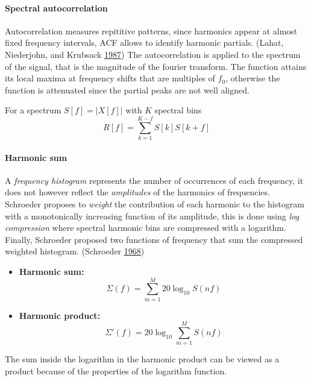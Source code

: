 \documentclass[american,]{article}
\providecommand{\tightlist}{%
  \setlength{\itemsep}{0pt}\setlength{\parskip}{0pt}}
\let\oldparagraph\paragraph
\renewcommand{\paragraph}[1]{\oldparagraph{#1}\mbox{}}
\begin{document}
\hypertarget{spectral-autocorrelation}{%
\paragraph{Spectral autocorrelation}\label{spectral-autocorrelation}}

Autocorrelation measures repititive patterns, since harmonics
appear at almost fixed frequency intervals, ACF allows
to identify harmonic partials. (Lahat, Niederjohn, and Krubsack \protect\hyperlink{ref-lahat_spectral_1987}{1987})
The autocorrelation is applied to the spectrum of the signal,
that is the magnitude of the fourier transform.
The function attains its local maxima at frequency shifts
that are multiples of \(f_0\), otherwise the function
is attenuated since the partial peaks are not well aligned.

For a spectrum \(S[f]=\left\lvert X[f]\right\rvert\) with \(K\) spectral bins
\[R[f] = \sum_{k=1}^{K-f} S[k]S[k+f]\]

\hypertarget{harmonic-sum}{%
\paragraph{Harmonic sum}\label{harmonic-sum}}

A \emph{frequency histogram} represents the number of occurrences
of each frequency, it does not however reflect the \emph{amplitudes}
of the harmonics of frequencies.
Schroeder proposes to \emph{weight} the contribution of each harmonic
to the histogram with a monotonically increasing function
of its amplitude, this is done using \emph{log compression}
where spectral harmonic bins are compressed with a logarithm.
Finally, Schroeder proposed two functions of frequency that
sum the compressed weighted histogram. (Schroeder \protect\hyperlink{ref-schroeder_period_1968}{1968})

\begin{itemize}
\tightlist
\item
  \textbf{Harmonic sum:} \[\Sigma(f)=\sum_{m=1}^M 20\log_{10}S(nf)\]
\item
  \textbf{Harmonic product:} \[\Sigma'(f)=20\log_{10}\sum_{m=1}^M S(nf)\]
\end{itemize}

The sum inside the logarithm in the harmonic product
can be viewed as a product because of the properties
of the logarithm function.
\end{document}
